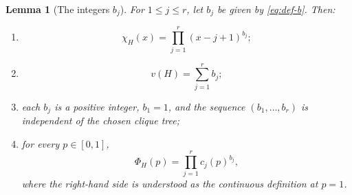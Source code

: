 \documentclass[11pt]{article}
\newtheorem{lemma}[lemma]{Lemma}
\numberwithin{equation}{section}
\newcommand{\PhiH}{\Phi_H}
\begin{document}
\begin{lemma}[The integers $b_j$]\label{lem:b-properties}
For $1\leq j\leq r$, let $b_j$ be given by \eqref{eq:def-b}.  Then:
\begin{enumerate}[label=\textup{(\roman*)}]
\item
\begin{equation}
 \chi_H(x)
 =
 \prod_{j=1}^r (x-j+1)^{b_j};\label{eq:chi-b-factorization}
\end{equation}
\item
\begin{equation}
 v(H)=\sum_{j=1}^r b_j;\label{eq:v-sum-b}
\end{equation}
\item each $b_j$ is a positive integer, $b_1=1$, and the sequence
$(b_1,\dots,b_r)$ is independent of the chosen clique tree;
\item for every $p\in[0,1]$,
\begin{equation}
 \PhiH(p)=\prod_{j=1}^r c_j(p)^{b_j},\label{eq:Phi-product}
\end{equation}
where the right-hand side is understood as the continuous definition at
$p=1$.
\end{enumerate}
\end{lemma}
\end{document}
